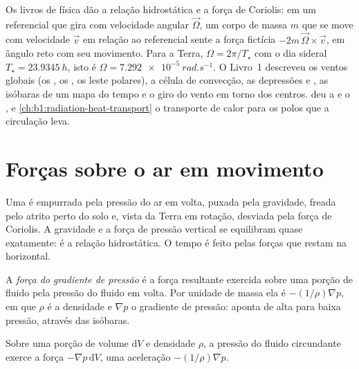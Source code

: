 \begin{recall}
Os livros de física dão a relação hidrostática e a força de Coriolis: em um referencial que gira com
velocidade angular $\vec\Omega$, um corpo de massa $m$ que se move com velocidade $\vec v$ em
relação ao referencial sente a força fictícia $-2m\,\vec\Omega\times\vec v$, em ângulo reto com seu
movimento. Para a Terra, $\Omega = 2\pi/T_\star$ com o dia sideral $T_\star = \qty{23.9345}{h}$, isto
é $\Omega = \qty{7.292e-5}{rad.s^{-1}}$. O Livro~1 descreveu os ventos globais (os , os
, os leste polares), a célula de convecção, as depressões e , as isóbaras
de um mapa do tempo e o giro do vento em torno dos centros. 
deu a  e o , e \cref{ch:b1:radiation-heat-transport} o
transporte de calor para os polos que a circulação leva.
\end{recall}

\section{Forças sobre o ar em movimento}\label{sec:b1:atmospheric-circulation:forces}

Uma  é empurrada pela pressão do ar em volta, puxada pela gravidade, freada pelo atrito
perto do solo e, vista da Terra em rotação, desviada pela força de Coriolis. A gravidade e a força
de pressão vertical se equilibram quase exatamente: é a relação hidrostática. O tempo é feito pelas
forças que restam na horizontal.

\begin{definition}\label{def:b1:atmospheric-circulation:pgf}
A \emph{força do gradiente de pressão} é a força resultante
exercida sobre uma porção de fluido pela pressão do fluido em volta. Por unidade de massa ela é
$-(1/\rho)\nabla p$, em que $\rho$ é a densidade e $\nabla p$ o gradiente de pressão: aponta de alta
para baixa pressão, através das isóbaras.
\end{definition}

\begin{proposition}\label{prop:b1:atmospheric-circulation:pgf}
Sobre uma porção de volume $\mathrm dV$ e densidade $\rho$, a pressão do fluido circundante exerce a
força $-\nabla p\,\mathrm dV$, uma aceleração $-(1/\rho)\nabla p$.
\end{proposition}

